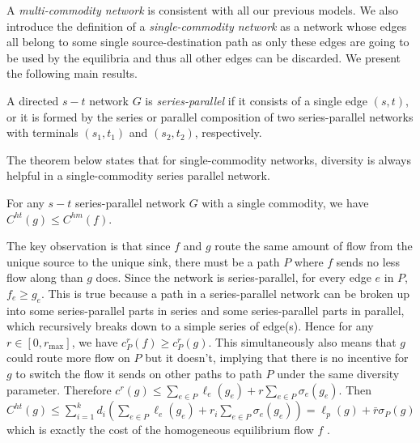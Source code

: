 A {\it multi-commodity network} is consistent with all our previous models. We also introduce the definition of a {\it single-commodity network} as a network whose edges all belong to some single source-destination path as only these edges are going to be used by the equilibria and thus all other edges can be discarded. We present the following main results.

\begin{definition}
A directed $s-t$ network $G$ is {\it series-parallel} if it consists of a single edge $(s, t)$, or it is formed by the series or parallel composition of two series-parallel networks with terminals $(s_1, t_1)$ and $(s_2, t_2)$, respectively.
\end{definition}

The theorem below states that for single-commodity networks, diversity is always helpful in a single-commodity series parallel network.

\begin{theorem}
For any $s-t$ series-parallel network $G$ with a single commodity, we have $C^{ht}(g)\le C^{hm}(f)$.
\label{diverse1}
\end{theorem}

\begin{proof-sketch}

    The key observation is that since $f$ and $g$ route the same amount of flow from the unique source to the unique sink, there must be a path $P$ where $f$ sends no less flow along than $g$ does.  Since the network is series-parallel, for every edge $e$ in $P$, $f_e \ge g_e$. This is true because a path in a series-parallel network can be broken up into some series-parallel parts in series and some series-parallel parts in parallel, which recursively breaks down to a simple series of edge(s). Hence for any $r\in [0, r_{\max}]$, we have $c_P^r(f)\ge c_P^r(g)$. This simultaneously also means that $g$ could route more flow on $P$ but it doesn't, implying that there is no incentive for $g$ to switch the flow it sends on other paths to path $P$ under the same diversity parameter. Therefore  $c^r(g)\le \sum_{e\in P} \ell_e(g_e)+r\sum_{e\in P}\sigma_e(g_e)$. Then $C^{ht}(g)\le \sum_{i=1}^k d_i(\sum_{e\in P} \ell_e(g_e)+r_i\sum_{e\in P}\sigma_e(g_e))=\ell_p(g)+\bar{r}\sigma_P(g)$ which is exactly the cost of the homogeneous equilibrium flow $f$ .
\end{proof-sketch}


